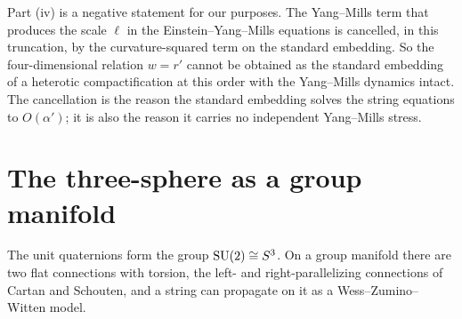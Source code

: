Part (iv) is a negative statement for our purposes. The Yang--Mills term that produces the scale $\ell$ in the Einstein--Yang--Mills equations is cancelled, in this truncation, by the curvature-squared term on the standard embedding. So the four-dimensional relation $w=r'$ cannot be obtained as the standard embedding of a heterotic compactification at this order with the Yang--Mills dynamics intact. The cancellation is the reason the standard embedding solves the string equations to $O(\alpha')$; it is also the reason it carries no independent Yang--Mills stress.

\section{The three-sphere as a group manifold}

The unit quaternions form the group $\mathrm{SU}(2)\cong S^3$. On a group manifold there are two flat connections with torsion, the left- and right-parallelizing connections of Cartan and Schouten, and a string can propagate on it as a Wess--Zumino--Witten model.

